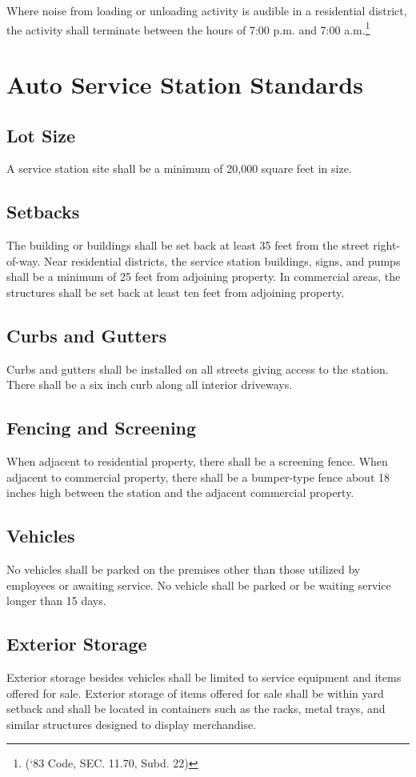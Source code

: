 \subsubsection{}
Where noise from loading or unloading activity is audible in a residential district, the activity shall terminate between the hours of 7:00 p.m. and 7:00 a.m.\footnote{(‘83 Code, SEC. 11.70, Subd. 22)}
\section{Auto Service Station Standards}
\subsection{Lot Size}
A service station site shall be a minimum of 20,000 square feet in size.
\subsection{Setbacks}
The building or buildings shall be set back at least 35 feet from the street right-of-way. Near residential districts, the service station buildings, signs, and pumps shall be a minimum of 25 feet from adjoining property. In commercial areas, the structures shall be set back at least ten feet from adjoining property.
\subsection{Curbs and Gutters}
Curbs and gutters shall be installed on all streets giving access to the station. There shall be a six inch curb along all interior driveways.
\subsection{Fencing and Screening}
When adjacent to residential property, there shall be a screening fence. When adjacent to commercial property, there shall be a bumper-type fence about 18 inches high between the station and the adjacent commercial property.
\subsection{Vehicles}
No vehicles shall be parked on the premises other than those utilized by employees or awaiting service. No vehicle shall be parked or be waiting service longer than 15 days.
\subsection{Exterior Storage}
Exterior storage besides vehicles shall be limited to service equipment and items offered for sale. Exterior storage of items offered for sale shall be within yard setback and shall be located in containers such as the racks, metal trays, and similar structures designed to display merchandise.
